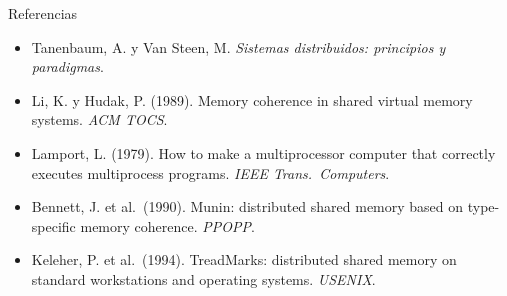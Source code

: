 \documentclass[aspectratio=169,11pt]{beamer}
\newcommand{\redDeco}[1]{%
  \begin{scope}[#1]
    \coordinate (n1) at (0,0);     \coordinate (n2) at (1.9,1.15);  \coordinate (n3) at (3.4,.1);
    \coordinate (n4) at (1.4,-1.35);\coordinate (n5) at (3.1,-2.0);  \coordinate (n6) at (4.7,-1.0);
    \coordinate (n7) at (.1,-2.7); \coordinate (n8) at (4.3,1.8);   \coordinate (n9) at (5.5,.45);
    \coordinate (n10) at (1.9,-3.5);\coordinate (n11) at (5.0,-3.0); \coordinate (n12) at (.6,1.9);
    \foreach \a/\b in {n1/n2,n2/n3,n1/n4,n4/n3,n3/n6,n4/n5,n5/n6,n2/n8,n8/n9,n3/n9,n6/n9,n4/n7,
                       n7/n10,n5/n10,n5/n11,n6/n11,n3/n8,n12/n2,n12/n1}
      {\draw[vl!55!fondo,line width=.9pt] (\a) -- (\b);}
    \foreach \a/\b/\t in {n1/n2/.45,n3/n6/.6,n4/n5/.35,n8/n9/.5,n5/n11/.55}
      {\fill[menta] ($(\a)!\t!(\b)$) circle (1.5pt);}
    \foreach \n in {n2,n5,n7,n9,n10,n11,n12}
      {\fill[vl,opacity=.25] (\n) circle (6pt); \fill[vl] (\n) circle (2.4pt);}
    \foreach \n/\ic/\c in {n1/\faLaptop/menta,n4/\faLaptop/menta,n6/\faLaptop/menta,n8/\faLaptop/menta,n3/\faServer/ambar}
      {\fill[\c,opacity=.14] (\n) circle (.62);
       \node[circle,draw=\c,line width=1.1pt,fill=panel,text=\c,minimum size=.8cm,inner sep=0pt] at (\n) {\small\ic};}
  \end{scope}}
\begin{document}
\begin{frame}{Referencias}
  \footnotesize
  \begin{itemize}\setlength{\itemsep}{.4em}
    \item[\textcolor{vl}{\faBook}] Tanenbaum, A. y Van Steen, M. \emph{Sistemas distribuidos: principios y paradigmas}.
    \item[\textcolor{vl}{\faBook}] Li, K. y Hudak, P. (1989). Memory coherence in shared virtual memory systems. \emph{ACM TOCS}.
    \item[\textcolor{vl}{\faBook}] Lamport, L. (1979). How to make a multiprocessor computer that correctly executes multiprocess programs. \emph{IEEE Trans.\ Computers}.
    \item[\textcolor{vl}{\faBook}] Bennett, J. et al.\ (1990). Munin: distributed shared memory based on type-specific memory coherence. \emph{PPOPP}.
    \item[\textcolor{vl}{\faBook}] Keleher, P. et al.\ (1994). TreadMarks: distributed shared memory on standard workstations and operating systems. \emph{USENIX}.
  \end{itemize}
\end{frame}

\begin{frame}[plain]
\end{frame}
\end{document}
